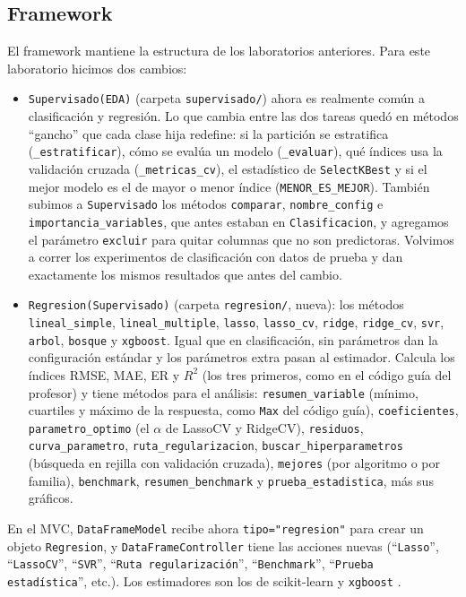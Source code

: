 \documentclass[11pt,a4paper]{article}
\let\citepOriginal\citep
\renewcommand*{\citep}[1]{\textbf{\citepOriginal{#1}}}%
\begin{document}
\subsection{Framework}
El framework mantiene la estructura de los laboratorios anteriores. Para este laboratorio hicimos dos cambios:
\begin{itemize}
  \item \texttt{Supervisado(EDA)} (carpeta \texttt{supervisado/}) ahora es realmente común a clasificación y regresión. Lo que cambia entre las dos tareas quedó en métodos ``gancho'' que cada clase hija redefine: si la partición se estratifica (\texttt{\_estratificar}), cómo se evalúa un modelo (\texttt{\_evaluar}), qué índices usa la validación cruzada (\texttt{\_metricas\_cv}), el estadístico de \texttt{SelectKBest} y si el mejor modelo es el de mayor o menor índice (\texttt{MENOR\_ES\_MEJOR}). También subimos a \texttt{Supervisado} los métodos \texttt{comparar}, \texttt{nombre\_config} e \texttt{importancia\_variables}, que antes estaban en \texttt{Clasificacion}, y agregamos el parámetro \texttt{excluir} para quitar columnas que no son predictoras. Volvimos a correr los experimentos de clasificación con datos de prueba y dan exactamente los mismos resultados que antes del cambio.
  \item \texttt{Regresion(Supervisado)} (carpeta \texttt{regresion/}, nueva): los métodos \texttt{lineal\_simple}, \texttt{lineal\_multiple}, \texttt{lasso}, \texttt{lasso\_cv}, \texttt{ridge}, \texttt{ridge\_cv}, \texttt{svr}, \texttt{arbol}, \texttt{bosque} y \texttt{xgboost}. Igual que en clasificación, sin parámetros dan la configuración estándar y los parámetros extra pasan al estimador. Calcula los índices RMSE, MAE, ER y $R^2$ (los tres primeros, como en el código guía del profesor) y tiene métodos para el análisis: \texttt{resumen\_variable} (mínimo, cuartiles y máximo de la respuesta, como \texttt{Max} del código guía), \texttt{coeficientes}, \texttt{parametro\_optimo} (el $\alpha$ de LassoCV y RidgeCV), \texttt{residuos}, \texttt{curva\_parametro}, \texttt{ruta\_regularizacion}, \texttt{buscar\_hiperparametros} (búsqueda en rejilla con validación cruzada), \texttt{mejores} (por algoritmo o por familia), \texttt{benchmark}, \texttt{resumen\_benchmark} y \texttt{prueba\_estadistica}, más sus gráficos.
\end{itemize}
En el MVC, \texttt{DataFrameModel} recibe ahora \verb|tipo="regresion"| para crear un objeto \texttt{Regresion}, y \texttt{DataFrameController} tiene las acciones nuevas (``\texttt{Lasso}'', ``\texttt{LassoCV}'', ``\texttt{SVR}'', ``\texttt{Ruta regularización}'', ``\texttt{Benchmark}'', ``\texttt{Prueba estadística}'', etc.). Los estimadores son los de scikit-learn \citep{pedregosa2011} y \texttt{xgboost} \citep{chen2016}.
\end{document}
